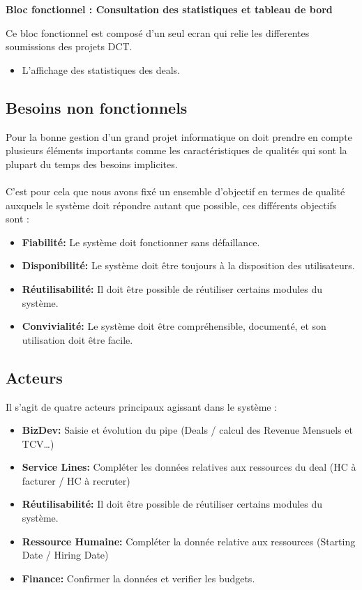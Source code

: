 \vspace{0.5cm}
\textbf{\color{red}Bloc fonctionnel : Consultation des statistiques et tableau de bord}
    
Ce bloc fonctionnel est composé d'un seul ecran qui relie les differentes soumissions des projets DCT.
\begin{itemize}
    \item L’affichage des statistiques des deals.
\end{itemize}

\subsection{Besoins non fonctionnels}

Pour la bonne gestion d'un grand projet informatique on doit prendre en compte plusieurs éléments importants comme les caractéristiques de qualités qui sont la plupart du temps des besoins implicites.
\\\\
C'est pour cela que nous avons fixé un ensemble d'objectif en termes de qualité auxquels le système doit répondre autant que possible, ces différents objectifs sont :
\\
\begin{itemize}
    \item \textbf{Fiabilité:} Le système doit fonctionner sans défaillance.
    \item \textbf{Disponibilité:} Le système doit être toujours à la disposition des utilisateurs.
    \item \textbf{Réutilisabilité:} Il doit être possible de réutiliser certains modules du
système.
    \item \textbf{Convivialité:} Le système doit être compréhensible, documenté, et son
utilisation doit être facile.
\end{itemize}

\subsection{Acteurs}
Il s’agit de quatre acteurs principaux agissant dans le système :
\\
\begin{itemize}
    \item \textbf{BizDev:} Saisie et évolution du pipe (Deals / calcul des Revenue Mensuels
et TCV…)
    \item \textbf{Service Lines:} Compléter les données relatives aux ressources du deal (HC à facturer / HC à recruter)
    \item \textbf{Réutilisabilité:} Il doit être possible de réutiliser certains modules du
système.
    \item \textbf{Ressource Humaine:} Compléter la donnée relative aux ressources (Starting Date / Hiring
Date)
    \item \textbf{Finance:} Confirmer la données et verifier les budgets.
\end{itemize}


